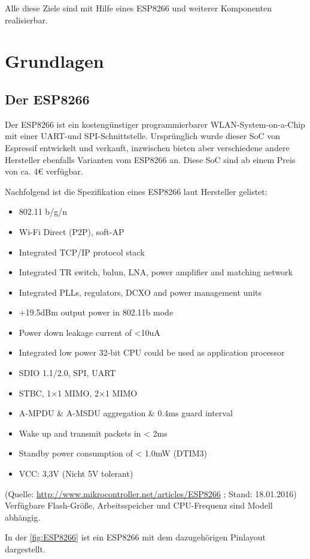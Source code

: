 Alle diese Ziele sind mit Hilfe eines ESP8266 und weiterer Komponenten realisierbar.

\section{Grundlagen}
\subsection{Der ESP8266}
Der ESP8266 ist ein kostengünstiger programmierbarer WLAN-System-on-a-Chip mit einer UART-und SPI-Schnittstelle.
Ursprünglich wurde dieser SoC von Espressif entwickelt und verkauft, inzwischen bieten aber verschiedene andere Hersteller ebenfalls Varianten vom ESP8266 an.
Diese SoC sind ab einem Preis von ca. 4€ verfügbar.

Nachfolgend ist die Spezifikation eines ESP8266 laut Hersteller gelistet:

\begin{itemize}
	\item 802.11 b/g/n
    \item Wi-Fi Direct (P2P), soft-AP
    \item Integrated TCP/IP protocol stack
    \item Integrated TR switch, balun, LNA, power amplifier and matching network
    \item Integrated PLLs, regulators, DCXO and power management units
    \item +19.5dBm output power in 802.11b mode
    \item Power down leakage current of <10uA
    \item Integrated low power 32-bit CPU could be used as application processor
    \item SDIO 1.1/2.0, SPI, UART
    \item STBC, 1×1 MIMO, 2×1 MIMO
    \item A-MPDU \& A-MSDU aggregation \& 0.4ms guard interval
    \item Wake up and transmit packets in < 2ms
    \item Standby power consumption of < 1.0mW (DTIM3)
    \item VCC: 3,3V (Nicht 5V tolerant)
\end{itemize}
(Quelle: \url{http://www.mikrocontroller.net/articles/ESP8266} ; Stand: 18.01.2016)
Verfügbare Flash-Größe, Arbeitsspeicher und CPU-Frequenz sind Modell abhängig.

In der \autoref{fig:ESP8266} ist ein ESP8266 mit dem dazugehörigen Pinlayout dargestellt.

